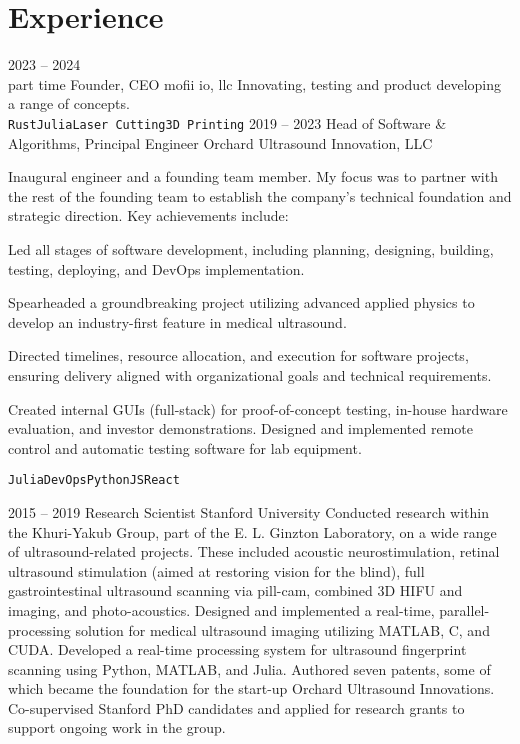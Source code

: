 \documentclass[8pt]{mofiicv}
\begin{document}
\begin{minipage}[T]{\SecondColumnWidth} 
\section{Experience}
\begin{entrylist}
	\entry
		{2023 -- 2024\\\footnotesize{part time}}
		{Founder, CEO}
		{mofii io, llc}
		{
		Innovating, testing and product developing a range of concepts.\\ 
		\texttt{Rust}\slashsep\texttt{Julia}\slashsep\texttt{Laser Cutting}\slashsep\texttt{3D Printing}
		}
	\entry
		{2019 -- 2023}
		{Head of Software \& Algorithms, Principal Engineer}
		{Orchard Ultrasound Innovation, LLC}
		{
		Inaugural engineer and a founding team member. My focus was to partner with the rest of the founding team to establish the company’s technical foundation and strategic direction. Key achievements include:
		\begin{description}[noitemsep,font=\normalfont\itshape]
			\item[Software Development Leadership] Led all stages of software development, including planning, designing, building, testing, deploying, and DevOps implementation.
			\item[Nonlinear Signal Processing] Spearheaded a groundbreaking project utilizing advanced applied physics to develop an industry-first feature in medical ultrasound. 
			\item[Strategic Project Management]  Directed timelines, resource allocation, and execution for software projects, ensuring delivery aligned with organizational goals and technical requirements.
			\item[Innovative Software Solutions] Created internal GUIs (full-stack) for proof-of-concept testing, in-house hardware evaluation, and investor demonstrations. Designed and implemented remote control and automatic testing software for lab equipment.
		\end{description}
		\texttt{Julia}\slashsep\texttt{DevOps}\slashsep\texttt{Python}\slashsep\texttt{JS}\slashsep\texttt{React}
		}
	\entry
		{2015 -- 2019}
		{Research Scientist}
		{Stanford University}
		{
		Conducted research within the Khuri-Yakub Group, part of the E. L. Ginzton Laboratory, on a wide range of ultrasound-related projects. These included acoustic neurostimulation, retinal ultrasound stimulation (aimed at restoring vision for the blind), full gastrointestinal ultrasound scanning via pill-cam, combined 3D HIFU and imaging, and photo-acoustics. Designed and implemented a real-time, parallel-processing solution for medical ultrasound imaging utilizing MATLAB, C, and CUDA. Developed a real-time processing system for ultrasound fingerprint scanning using Python, MATLAB, and Julia. Authored seven patents, some of which became the foundation for the start-up Orchard Ultrasound Innovations. Co-supervised Stanford PhD candidates and applied for research grants to support ongoing work in the group.\\ 
}
\end{entrylist}
\end{minipage}
\end{document}
